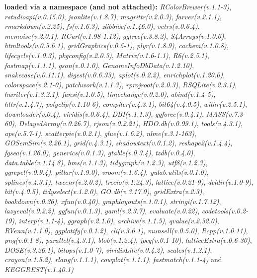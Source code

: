 \documentclass[
]{book}
\begin{document}
\textbf{loaded via a namespace (and not attached):}
\emph{RColorBrewer(v.1.1-3)}, \emph{rstudioapi(v.0.15.0)}, \emph{jsonlite(v.1.8.7)}, \emph{magrittr(v.2.0.3)}, \emph{farver(v.2.1.1)}, \emph{rmarkdown(v.2.25)}, \emph{fs(v.1.6.3)}, \emph{zlibbioc(v.1.46.0)}, \emph{vctrs(v.0.6.4)}, \emph{memoise(v.2.0.1)}, \emph{RCurl(v.1.98-1.12)}, \emph{ggtree(v.3.8.2)}, \emph{S4Arrays(v.1.0.6)}, \emph{htmltools(v.0.5.6.1)}, \emph{gridGraphics(v.0.5-1)}, \emph{plyr(v.1.8.9)}, \emph{cachem(v.1.0.8)}, \emph{lifecycle(v.1.0.3)}, \emph{pkgconfig(v.2.0.3)}, \emph{Matrix(v.1.6-1.1)}, \emph{R6(v.2.5.1)}, \emph{fastmap(v.1.1.1)}, \emph{gson(v.0.1.0)}, \emph{GenomeInfoDbData(v.1.2.10)}, \emph{snakecase(v.0.11.1)}, \emph{digest(v.0.6.33)}, \emph{aplot(v.0.2.2)}, \emph{enrichplot(v.1.20.0)}, \emph{colorspace(v.2.1-0)}, \emph{patchwork(v.1.1.3)}, \emph{rprojroot(v.2.0.3)}, \emph{RSQLite(v.2.3.1)}, \emph{hwriter(v.1.3.2.1)}, \emph{fansi(v.1.0.5)}, \emph{timechange(v.0.2.0)}, \emph{abind(v.1.4-5)}, \emph{httr(v.1.4.7)}, \emph{polyclip(v.1.10-6)}, \emph{compiler(v.4.3.1)}, \emph{bit64(v.4.0.5)}, \emph{withr(v.2.5.1)}, \emph{downloader(v.0.4)}, \emph{viridis(v.0.6.4)}, \emph{DBI(v.1.1.3)}, \emph{ggforce(v.0.4.1)}, \emph{MASS(v.7.3-60)}, \emph{DelayedArray(v.0.26.7)}, \emph{rjson(v.0.2.21)}, \emph{HDO.db(v.0.99.1)}, \emph{tools(v.4.3.1)}, \emph{ape(v.5.7-1)}, \emph{scatterpie(v.0.2.1)}, \emph{glue(v.1.6.2)}, \emph{nlme(v.3.1-163)}, \emph{GOSemSim(v.2.26.1)}, \emph{grid(v.4.3.1)}, \emph{shadowtext(v.0.1.2)}, \emph{reshape2(v.1.4.4)}, \emph{fgsea(v.1.26.0)}, \emph{generics(v.0.1.3)}, \emph{gtable(v.0.3.4)}, \emph{tzdb(v.0.4.0)}, \emph{data.table(v.1.14.8)}, \emph{hms(v.1.1.3)}, \emph{tidygraph(v.1.2.3)}, \emph{utf8(v.1.2.3)}, \emph{ggrepel(v.0.9.4)}, \emph{pillar(v.1.9.0)}, \emph{vroom(v.1.6.4)}, \emph{yulab.utils(v.0.1.0)}, \emph{splines(v.4.3.1)}, \emph{tweenr(v.2.0.2)}, \emph{treeio(v.1.24.3)}, \emph{lattice(v.0.21-9)}, \emph{deldir(v.1.0-9)}, \emph{bit(v.4.0.5)}, \emph{tidyselect(v.1.2.0)}, \emph{GO.db(v.3.17.0)}, \emph{gridExtra(v.2.3)}, \emph{bookdown(v.0.36)}, \emph{xfun(v.0.40)}, \emph{graphlayouts(v.1.0.1)}, \emph{stringi(v.1.7.12)}, \emph{lazyeval(v.0.2.2)}, \emph{ggfun(v.0.1.3)}, \emph{yaml(v.2.3.7)}, \emph{evaluate(v.0.22)}, \emph{codetools(v.0.2-19)}, \emph{interp(v.1.1-4)}, \emph{ggraph(v.2.1.0)}, \emph{archive(v.1.1.5)}, \emph{qvalue(v.2.32.0)}, \emph{RVenn(v.1.1.0)}, \emph{ggplotify(v.0.1.2)}, \emph{cli(v.3.6.1)}, \emph{munsell(v.0.5.0)}, \emph{Rcpp(v.1.0.11)}, \emph{png(v.0.1-8)}, \emph{parallel(v.4.3.1)}, \emph{blob(v.1.2.4)}, \emph{jpeg(v.0.1-10)}, \emph{latticeExtra(v.0.6-30)}, \emph{DOSE(v.3.26.1)}, \emph{bitops(v.1.0-7)}, \emph{viridisLite(v.0.4.2)}, \emph{scales(v.1.2.1)}, \emph{crayon(v.1.5.2)}, \emph{rlang(v.1.1.1)}, \emph{cowplot(v.1.1.1)}, \emph{fastmatch(v.1.1-4)} and \emph{KEGGREST(v.1.40.1)}
\end{document}
